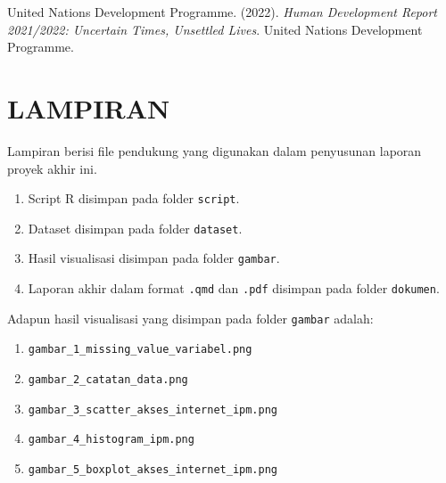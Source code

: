 \documentclass[
  indonesian,
  letterpaper,
  DIV=11,
  numbers=noendperiod]{scrartcl}
\providecommand{\tightlist}{%
  \setlength{\itemsep}{0pt}\setlength{\parskip}{0pt}}
\begin{document}
United Nations Development Programme. (2022). \emph{Human Development
Report 2021/2022: Uncertain Times, Unsettled Lives}. United Nations
Development Programme.

\section{LAMPIRAN}\label{lampiran}

Lampiran berisi file pendukung yang digunakan dalam penyusunan laporan
proyek akhir ini.

\begin{enumerate}
\def\labelenumi{\arabic{enumi}.}
\tightlist
\item
  Script R disimpan pada folder \texttt{script}.
\item
  Dataset disimpan pada folder \texttt{dataset}.
\item
  Hasil visualisasi disimpan pada folder \texttt{gambar}.
\item
  Laporan akhir dalam format \texttt{.qmd} dan \texttt{.pdf} disimpan
  pada folder \texttt{dokumen}.
\end{enumerate}

Adapun hasil visualisasi yang disimpan pada folder \texttt{gambar}
adalah:

\begin{enumerate}
\def\labelenumi{\arabic{enumi}.}
\tightlist
\item
  \texttt{gambar\_1\_missing\_value\_variabel.png}
\item
  \texttt{gambar\_2\_catatan\_data.png}
\item
  \texttt{gambar\_3\_scatter\_akses\_internet\_ipm.png}
\item
  \texttt{gambar\_4\_histogram\_ipm.png}
\item
  \texttt{gambar\_5\_boxplot\_akses\_internet\_ipm.png}
\end{enumerate}
\end{document}
